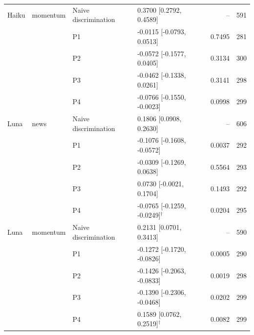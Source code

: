 \begin{table}[tbp]
\begin{tabularx}{\linewidth}{@{}lllXrr@{}}
\midrule
Haiku & momentum & Naive discrimination & 0.3700 [0.2792, 0.4589] & -- & 591 \\
 &  & P1 & -0.0115 [-0.0793, 0.0513] & 0.7495 & 281 \\
 &  & P2 & -0.0572 [-0.1577, 0.0405] & 0.3134 & 300 \\
 &  & P3 & -0.0462 [-0.1338, 0.0261] & 0.3141 & 298 \\
 &  & P4 & -0.0766 [-0.1550, -0.0023] & 0.0998 & 299 \\
\midrule
Luna & news & Naive discrimination & 0.1806 [0.0908, 0.2630] & -- & 606 \\
 &  & P1 & -0.1076 [-0.1608, -0.0572] & 0.0037 & 292 \\
 &  & P2 & -0.0309 [-0.1269, 0.0638] & 0.5564 & 293 \\
 &  & P3 & 0.0730 [-0.0021, 0.1704] & 0.1493 & 292 \\
 &  & P4 & -0.0765 [-0.1259, -0.0249]$^{\dagger}$ & 0.0204 & 295 \\
\midrule
Luna & momentum & Naive discrimination & 0.2131 [0.0701, 0.3413] & -- & 590 \\
 &  & P1 & -0.1272 [-0.1720, -0.0826] & 0.0005 & 290 \\
 &  & P2 & -0.1426 [-0.2063, -0.0833] & 0.0019 & 298 \\
 &  & P3 & -0.1390 [-0.2306, -0.0468] & 0.0202 & 299 \\
 &  & P4 & 0.1589 [0.0762, 0.2519]$^{\dagger}$ & 0.0082 & 299 \\
\bottomrule
\end{tabularx}
\end{table}
